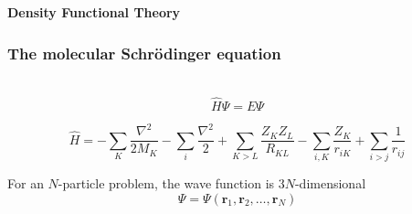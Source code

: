 
\begin{frame}
    \centering
    \textbf{\Large{Density Functional Theory}}
\end{frame}

\begin{frame}
    \frametitle{The molecular Schr\"{o}dinger equation}
    \ \\
    {\large
    \begin{equation}
	\nonumber
	\hat{H}\Psi = E\Psi
    \end{equation}
    }

    \begin{equation}
	\nonumber
	\hat{H} =
        - \sum_K \frac{\nabla^2}{2M_K} - \sum_i \frac{\nabla^2}{2}
	+ \sum_{K>L} \frac{Z_K Z_L}{R_{KL}} 
	- \sum_{i,K} \frac{Z_K}{r_{iK}} 
	+ \sum_{i>j} \frac{1}{r_{ij}} 
    \end{equation}

    \vspace{5mm}

    \centering
    For an $N$-particle problem, the wave function is $3N$-dimensional
    \begin{equation}
	\nonumber
	\Psi = \Psi(\boldsymbol{r}_1,\boldsymbol{r}_2,\dots,\boldsymbol{r}_N)
    \end{equation}

    \vspace{5mm}


\end{frame}

